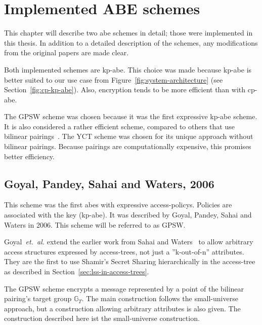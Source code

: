 \chapter{Implemented ABE schemes}\label{chapter:constructions} 

This chapter will describe two \acrshort{abe} schemes in detail; those were implemented in this thesis.
In addition to a detailed description of the schemes, any modifications from the original papers are made clear.

Both implemented schemes are \acrshort{kp-abe}.
This choice was made because \acrshort{kp-abe} is better suited to our use case from Figure~\ref{fig:system-architecture} (see Section~\ref{fig:cp-kp-abe}).
Also, encryption tends to be more efficient than with \acrshort{cp-abe}.

The GPSW scheme was chosen because it was the first expressive \acrshort{kp-abe} scheme. It is also considered a rather efficient scheme, compared to others that use bilinear pairings~\cite{girgenti_feasibility_2019}.
The YCT scheme was chosen for its unique approach without bilinear pairings. Because pairings are computationally expensive, this promises better efficiency.

\section{Goyal, Pandey, Sahai and Waters, 2006}
This scheme was the first \acrshort{abes} with expressive \glspl{access-policy}. Policies are associated with the key (\acrshort{kp-abe}).
It was described by Goyal, Pandey, Sahai and Waters \cite{goyal_attribute-based_2006} in 2006. This scheme will be referred to as GPSW.

Goyal~\emph{et.~al.} extend the earlier work from Sahai and Waters~\cite{sahai_fuzzy_2005} to allow arbitrary access structures expressed by \glspl{access-tree}, not just a ''k-out-of-n'' attributes.
They are the first to use Shamir's Secret Sharing hierarchically in the \gls{access-tree} as described in Section~\ref{sec:lss-in-access-trees}. 

The GPSW scheme encrypts a message represented by a point of the bilinear pairing's target group $\mathbb{G}_T$.
The main construction follows the \gls{small-universe} approach, but a construction allowing arbitrary attributes is also given.
The construction described here ist the \gls{small-universe} construction.

